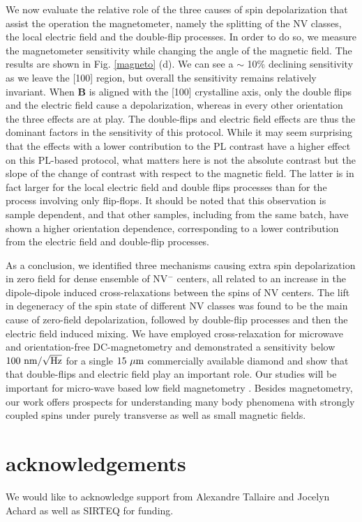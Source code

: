 \documentclass[preprintnumbers,amsmath,amssymb,superscriptaddress,twocolumn,showpacs]{revtex4-2}
\begin{document}
We now evaluate the relative role of the three causes of spin depolarization that assist the operation the magnetometer, namely the splitting of the NV classes, the local electric field and the double-flip processes. In order to do so, we measure the magnetometer sensitivity while changing the angle of the magnetic field.  The results are shown in Fig. \ref{magneto} (d). We can see a $\sim$ 10\% declining sensitivity as we leave the [100] region, but overall the sensitivity remains relatively invariant. 
When $\bm B$ is aligned with the [100] crystalline axis, only the double flips and the electric field cause a depolarization, whereas in every other orientation the three effects are at play.
The double-flips and electric field effects are thus the dominant factors in the sensitivity of this protocol. While it may seem surprising that the effects with a lower contribution to the PL contrast have a higher effect on this PL-based protocol, what matters here is not the absolute contrast but the slope of the change of contrast with respect to the magnetic field. The latter is in fact larger for the local electric field and double flips processes than for the process involving only flip-flops. 
It should be noted that this observation is sample dependent, and that other samples, including from the same batch, have shown a higher orientation dependence, corresponding to a lower contribution from the electric field and double-flip processes.

As a conclusion, we identified three mechanisms causing extra spin depolarization in zero field for dense ensemble of NV$^-$ centers, all related to an increase in the dipole-dipole induced cross-relaxations between the spins of NV centers. The lift in degeneracy of the spin state of different NV classes was found to be the main cause of zero-field depolarization, followed by double-flip processes and then the electric field induced mixing. We have employed cross-relaxation for microwave and orientation-free DC-magnetometry and demonstrated a sensitivity below $100\ \rm{nm}/\sqrt{\rm Hz}$ for a single $15\ \mu \rm m$ commercially available diamond and show that that double-flips and electric field play an important role.
Our studies will be important for micro-wave based low field magnetometry \cite{Vetter_LFM, WangRB}. 
Besides magnetometry, our work offers prospects for understanding many body phenomena with strongly coupled spins under purely transverse as well as small magnetic fields. 

\section*{acknowledgements}

We would like to acknowledge support from Alexandre Tallaire and Jocelyn Achard as well as 
SIRTEQ for funding.


{}
\end{document}
